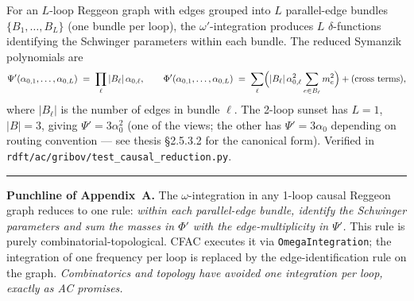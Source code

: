 \documentclass[11pt,a4paper]{article}
\begin{document}
For an $L$-loop Reggeon graph with edges grouped into $L$ parallel-edge bundles
$\{B_{1}, \ldots, B_{L}\}$ (one bundle per loop), the $\omega'$-integration produces
$L$ $\delta$-functions identifying the Schwinger parameters within each bundle. The
reduced Symanzik polynomials are
\[
\Psi'(\alpha_{0,1}, \ldots, \alpha_{0,L}) \;=\; \prod_{\ell} |B_{\ell}|\,\alpha_{0,\ell},
\qquad
\Phi'(\alpha_{0,1}, \ldots, \alpha_{0,L}) \;=\; \sum_{\ell}\Bigl(|B_{\ell}|\,\alpha_{0,\ell}^{2}
\sum_{e\in B_{\ell}} m_{e}^{2}\Bigr) + (\text{cross terms}),
\]
where $|B_{\ell}|$ is the number of edges in bundle $\ell$. The 2-loop sunset has
$L=1$, $|B|=3$, giving $\Psi' = 3\alpha_{0}^{2}$ (one of the views; the other has
$\Psi' = 3\alpha_{0}$ depending on routing convention --- see thesis \S 2.5.3.2 for
the canonical form). Verified in \texttt{rdft/ac/gribov/test\_causal\_reduction.py}.

\medskip
\hrule
\medskip
\noindent\textbf{Punchline of Appendix~A.} The $\omega$-integration in any 1-loop causal
Reggeon graph reduces to one rule: \emph{within each parallel-edge bundle, identify the
Schwinger parameters and sum the masses in $\Phi'$ with the edge-multiplicity in $\Psi'$.}
This rule is purely combinatorial-topological. CFAC executes it via
\texttt{OmegaIntegration}; the integration of one frequency per loop is replaced by the
edge-identification rule on the graph. \emph{Combinatorics and topology have avoided one
integration per loop, exactly as AC promises.}
\end{document}
